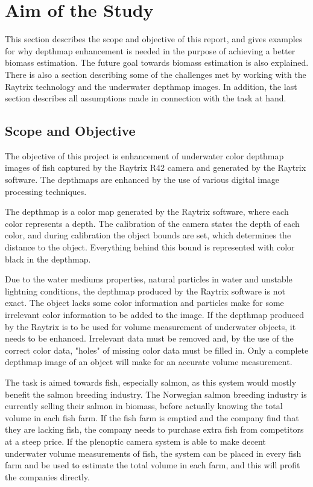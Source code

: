 \section{Aim of the Study}\label{aim of study}

This section describes the scope and objective of this report, and gives examples for why depthmap enhancement is needed in the purpose of achieving a better biomass estimation. The future goal towards biomass estimation is also explained. There is also a section describing some of the challenges met by working with the Raytrix technology and the underwater depthmap images. In addition, the last section describes all assumptions made in connection with the task at hand.


\subsection{Scope and Objective}

The objective of this project is enhancement of underwater color depthmap images of fish captured by the Raytrix R42 camera and generated by the Raytrix software. The depthmaps are enhanced by the use of various digital image processing techniques.
\newline

The depthmap is a color map generated by the Raytrix software, where each color represents a depth. The calibration of the camera states the depth of each color, and during calibration the object bounds are set, which determines the distance to the object. Everything behind this bound is represented with color black in the depthmap.

Due to the water mediums properties, natural particles in water and unstable lightning conditions, the depthmap produced by the Raytrix software is not exact. The object lacks some color information and particles make for some irrelevant color information to be added to the image.
If the depthmap produced by the Raytrix is to be used for volume measurement of underwater objects, it needs to be enhanced. Irrelevant data must be removed and, by the use of the correct color data, "holes" of missing color data must be filled in.
Only a complete depthmap image of an object will make for an accurate volume measurement.

The task is aimed towards fish, especially salmon, as this system would mostly benefit the salmon breeding industry. The Norwegian salmon breeding industry is currently selling their salmon in biomass, before actually knowing the total volume in each fish farm. If the fish farm is emptied and the company find that they are lacking fish, the company needs to purchase extra fish from competitors at a steep price. 
If the plenoptic camera system is able to make decent underwater volume measurements of fish, the system can be placed in every fish farm and be used to estimate the total volume in each farm, and this will profit the companies directly.

